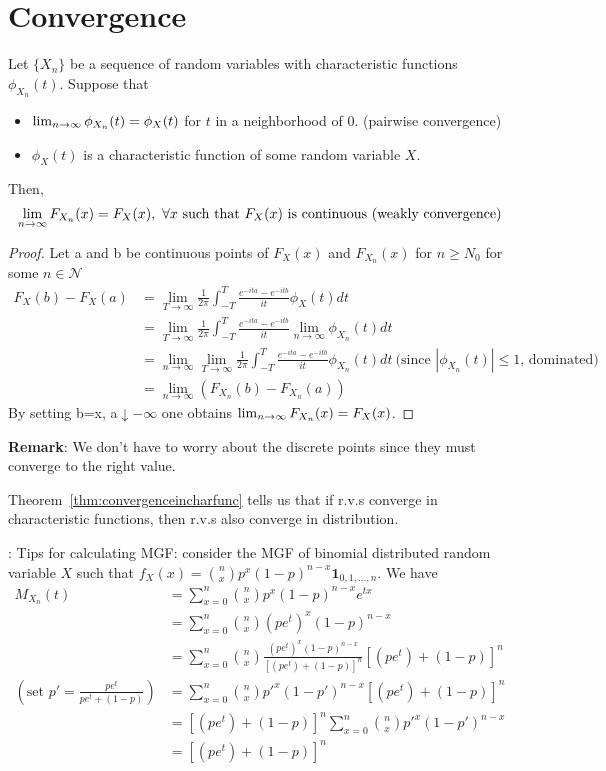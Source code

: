 \documentclass[../Transformation.tex]{subfiles}
\begin{document}
\section{Convergence}
\begin{theorem}\label{thm:convergenceincharfunc}
	Let $\{X_n \}$ be a sequence of random  variables with characteristic functions $\phi_{X_n}(t)$. Suppose that
	\begin{itemize}
		\item $\lim_{n\rightarrow\infty}\phi_{X_n}(t) = \phi_X(t)$ for $t$ in a neighborhood of 0. (pairwise convergence)
		\item $\phi_X(t)$ is a characteristic function of some random variable $X$.
	\end{itemize}
	Then,
	$$\limn F_{X_n}(x) = F_X(x),\ \forall x\mbox{ such that $F_X(x)\mbox{ is continuous (weakly convergence)}$}$$
\end{theorem}
	\begin{proof}
	Let a and b be continuous points of $F_X(x)$ and $F_{X_n}(x)$ for $n\geq N_0$ for some $n\in\mathcal{N}$
	\begin{align*}
	F_X(b)-F_X(a)&=\lim_{T\rightarrow\infty}\frac{1}{2\pi}\int_{-T}^T\frac{e^{-ita}-e^{-itb}}{it}\phi_X(t)dt\\
	&=\lim_{T\rightarrow\infty}\frac{1}{2\pi}\int_{-T}^T\frac{e^{-ita}-e^{-itb}}{it}\lim_{n\rightarrow\infty}\phi_{X_n}(t)dt\\
	&=\lim_{n\rightarrow\infty}\lim_{T\rightarrow\infty}\frac{1}{2\pi}\int_{-T}^T\frac{e^{-ita}-e^{-itb}}{it}\phi_{X_n}(t)dt\ \mbox{(since $|\phi_{X_n}(t)|\leq1$, dominated)}\\
	&=\lim_{n\rightarrow\infty}(F_{X_n}(b)-F_{X_n}(a))
	\end{align*}
	By setting b=x, a$\downarrow-\infty$ one obtains $\lim_{n\rightarrow\infty} F_{X_n}(x) = F_X(x)$.
	\end{proof}
{\bf Remark}: We don't have to worry about the discrete points since they must converge to the right value.\\
\begin{intuition}
	Theorem~\ref{thm:convergenceincharfunc} tells us that if r.v.s converge in characteristic functions, then r.v.s also converge in distribution.
\end{intuition}
: Tips for calculating MGF: consider the MGF of binomial distributed random variable $X$ such that $f_X(x)={n\choose x}p^{x}(1-p)^{n-x}\mathbf{1}_{0,1,...,n}$. We have
\begin{align*}
M_{X_n}(t) &= \sum_{x=0}^n{n\choose x}p^{x}(1-p)^{n-x}e^{tx}\\
&=\sum_{x=0}^n{n\choose x}(pe^t)^x(1-p)^{n-x}\\
&=\sum_{x=0}^n{n\choose x}\frac{(pe^t)^x(1-p)^{n-x}}{[(pe^t)+(1-p)]^n}[(pe^t)+(1-p)]^n\\
(\mbox{set }p'=\frac{pe^t}{pe^t+(1-p)})&=\sum_{x=0}^n{n\choose x}p'^x(1-p')^{n-x}[(pe^t)+(1-p)]^n\\
&=[(pe^t)+(1-p)]^n\sum_{x=0}^n{n\choose x}p'^x(1-p')^{n-x}\\
&=[(pe^t)+(1-p)]^n
\end{align*}
\end{document}
